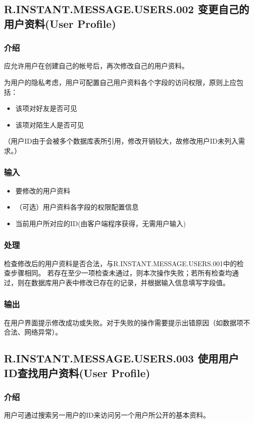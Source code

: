 \subsection{R.INSTANT.MESSAGE.USERS.002 变更自己的用户资料(User Profile)}
\subsubsection{介绍}
应允许用户在创建自己的帐号后，再次修改自己的用户资料。\\
{
	\color{red}
	为用户的隐私考虑，用户可配置自己用户资料各个字段的访问权限，原则上应包括：
	\begin{itemize}
		\item 该项对好友是否可见
		\item 该项对陌生人是否可见
	\end{itemize}
	（用户ID由于会被多个数据库表所引用，修改开销较大，故修改用户ID未列入需求。）
}


\subsubsection{输入}
\begin{itemize}
	\item 要修改的用户资料
	\item （可选）用户资料各字段的权限配置信息
	\item 当前用户所对应的ID(由客户端程序获得，无需用户输入)
	\end{itemize}

\subsubsection{处理}
检查修改后的用户资料是否合法，与R.INSTANT.MESSAGE.USERS.001中的检查步骤相同。
若存在至少一项检查未通过，则本次操作失败；若所有检查均通过，则在数据库用户表中修改已存在的记录，并根据输入信息填写字段值。
\subsubsection{输出}
在用户界面提示修改成功或失败。对于失败的操作需要提示出错原因（如数据项不合法、网络异常）。


\subsection{R.INSTANT.MESSAGE.USERS.003 使用用户ID查找用户资料(User Profile)}
\subsubsection{介绍}
用户可通过搜索另一用户的ID来访问另一个用户所公开的基本资料。

